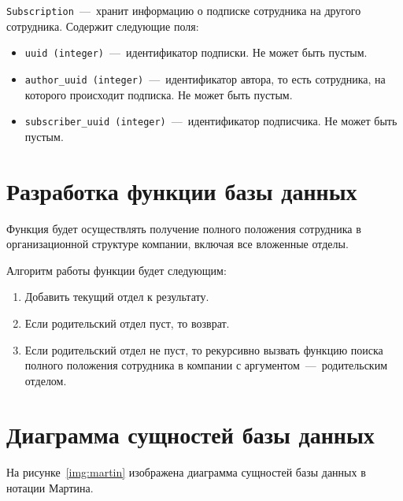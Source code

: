 \texttt{Subscription}~---~хранит информацию о подписке сотрудника на другого сотрудника. Содержит следующие поля:

\begin{itemize}
	\item \texttt{uuid (integer)}~---~идентификатор подписки. Не может быть пустым.
	\item \texttt{author\_uuid (integer)}~---~идентификатор автора, то есть сотрудника, на которого происходит подписка. Не может быть пустым.
	\item \texttt{subscriber\_uuid (integer)}~---~идентификатор подписчика. Не может быть пустым.
\end{itemize}

\section{Разработка функции базы данных}
Функция будет осуществлять получение полного положения сотрудника в организационной структуре компании, включая все вложенные отделы.

Алгоритм работы функции будет следующим:

\begin{enumerate}
	\item Добавить текущий отдел к результату.
	\item Если родительский отдел пуст, то возврат.
	\item Если родительский отдел не пуст, то рекурсивно вызвать функцию поиска полного положения сотрудника в компании с аргументом~---~родительским отделом.
\end{enumerate}

\newpage

\section{Диаграмма сущностей базы данных}
На рисунке~\ref{img:martin} изображена диаграмма сущностей базы данных в нотации Мартина.

